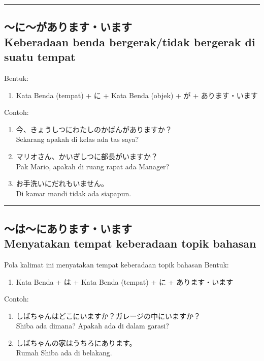 \vspace{0.2cm}\hrule height 1pt\vspace{0.2cm}


\subsection*{
    ～に～があります・います \\
    Keberadaan benda bergerak/tidak bergerak di suatu tempat
}
Bentuk:
\begin{enumerate}
    \item Kata Benda (tempat) + に + Kata Benda (objek) + が + あります・います
\end{enumerate}
Contoh: 
\begin{enumerate}
    \item 今、きょうしつにわたしのかばんがありますか？
    \\ Sekarang apakah di kelas ada tas saya?
    \item マリオさん、かいぎしつに部長がいますか？
    \\ Pak Mario, apakah di ruang rapat ada Manager?
    \item お手洗いにだれもいません。
    \\ Di kamar mandi tidak ada siapapun.
\end{enumerate}

\vspace{0.2cm}\hrule height 1pt\vspace{0.2cm}

\newpage
\subsection*{
    ～は～にあります・います \\
    Menyatakan tempat keberadaan topik bahasan
}
Pola kalimat ini menyatakan tempat keberadaan topik bahasan
Bentuk:
\begin{enumerate}
    \item Kata Benda + は + Kata Benda (tempat) + に + あります・います
\end{enumerate}
Contoh: 
\begin{enumerate}
    \item しばちゃんはどこにいますか？ガレージの中にいますか？
    \\ Shiba ada dimana? Apakah ada di dalam garasi?
    \item しばちゃんの家はうちろにあります。
    \\ Rumah Shiba ada di belakang.
\end{enumerate}

